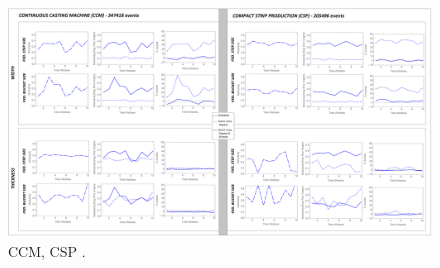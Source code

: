 \begin{landscape}
\begin{figure}[ht]
	\centering
	\includegraphics[width=1.35\textwidth]{../images/supplements-CCM_CSP_real_life_events_analysis-results-curves_and_discrete_time.png}
	\caption{CCM, CSP \cc{} \ee{}.}
	\label{figure-supplements-CCM_CSP-curveplots_discrete}
\end{figure}
\end{landscape}